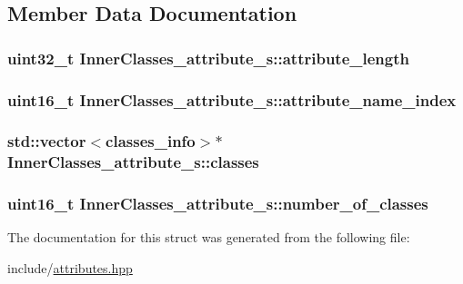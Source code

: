 \subsection{Member Data Documentation}
\hypertarget{structInnerClasses__attribute__s_ab142de1a85a18b4fa3f49b77668fcd4f}{
\subsubsection[{attribute\+\_\+length}]{\setlength{\rightskip}{0pt plus 5cm}uint32\+\_\+t Inner\+Classes\+\_\+attribute\+\_\+s\+::attribute\+\_\+length}}\label{structInnerClasses__attribute__s_ab142de1a85a18b4fa3f49b77668fcd4f}
\hypertarget{structInnerClasses__attribute__s_a8ea7a6459f4a7ae27d23fa13d15b058c}{
\subsubsection[{attribute\+\_\+name\+\_\+index}]{\setlength{\rightskip}{0pt plus 5cm}uint16\+\_\+t Inner\+Classes\+\_\+attribute\+\_\+s\+::attribute\+\_\+name\+\_\+index}}\label{structInnerClasses__attribute__s_a8ea7a6459f4a7ae27d23fa13d15b058c}
\hypertarget{structInnerClasses__attribute__s_a3461afb1424fa780c0ac8053ead725f7}{
\subsubsection[{classes}]{\setlength{\rightskip}{0pt plus 5cm}std\+::vector$<${\bf classes\+\_\+info}$>$$\ast$ Inner\+Classes\+\_\+attribute\+\_\+s\+::classes}}\label{structInnerClasses__attribute__s_a3461afb1424fa780c0ac8053ead725f7}
\hypertarget{structInnerClasses__attribute__s_ad5b6fc395dfe3380ec6a16df0cc618a4}{
\subsubsection[{number\+\_\+of\+\_\+classes}]{\setlength{\rightskip}{0pt plus 5cm}uint16\+\_\+t Inner\+Classes\+\_\+attribute\+\_\+s\+::number\+\_\+of\+\_\+classes}}\label{structInnerClasses__attribute__s_ad5b6fc395dfe3380ec6a16df0cc618a4}


The documentation for this struct was generated from the following file\+:\begin{DoxyCompactItemize}
\item 
include/\hyperlink{attributes_8hpp}{attributes.\+hpp}\end{DoxyCompactItemize}
